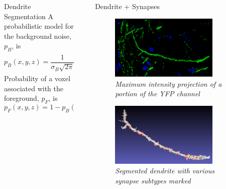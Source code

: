 \documentclass[final, table]{beamer}
\newlength{\sepwid}
\newlength{\onecolwid}
\newlength{\twocolwid}
\begin{document}
\begin{frame}[t]
\begin{columns}[t]
\begin{column}{\twocolwid}
\begin{columns}[t]
\begin{column}{\onecolwid}
\begin{block}{Dendrite Segmentation}
A probabilistic model for the background noise, $p_{B}$, is \begin{equation} 
p_B(x,y,z) = \frac{1}{\sigma_B \sqrt{2 \pi}} \int^{\infty}_{v(x,y,z)} e^{\frac{-(t - \mu_B)^2}{2 \sigma_B^2}} d t.
\end{equation} 
Probability of a voxel associated with the foreground, $p_F$, is 
\begin{equation}
p_F(x,y,z) = 1 - p_B(x,y,z).
\end{equation}


\end{block}



\end{column}


\begin{column}{\sepwid}\end{column}  %
\begin{column}{\onecolwid}

\begin{block}{Dendrite + Synapses} 


\begin{figure}
\centering
\includegraphics[width=0.8\textwidth]{figs/SnapshotDendriteR}
\caption{\textit{Maximum intensity projection of a portion of the YFP channel}}
\end{figure}

\begin{figure}
\centering
\includegraphics[width=0.8\textwidth]{figs/dendrite_allsynapses}
\caption{\textit{Segmented dendrite with various synapse subtypes marked}}
\end{figure}


\end{block}
\end{column}
\end{columns}
\end{column}
\end{columns}
\end{frame}
\end{document}

